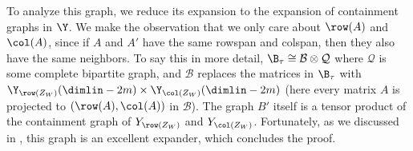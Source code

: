 To analyze this graph, we reduce its expansion to the expansion of containment graphs in \(\Y\). We make the observation that we only care about \(\row(A)\) and \(\col(A)\), since if \(A\) and \(A'\) have the same rowspan and colspan, then they also have the same neighbors. To say this in more detail, \(\B_\tau \cong \mathcal{B} \otimes \mathcal{Q}\) where \(\mathcal{Q}\) is some complete bipartite graph, and \(\mathcal{B}\) replaces the matrices in \(\B_\tau\) with \(\Y_{\row(Z_W)}(\dimlin-2m) \times \Y_{\col(Z_W)}(\dimlin-2m)\) (here every matrix \(A\) is projected to \((\row(A),\col(A))\) in \(\mathcal{B}\)).
%
The graph \(B'\) itself is a tensor product of the containment graph of \(Y_{\row(Z_W)}\) and \(Y_{\col(Z_W)}\). Fortunately, as we discussed in , this graph is an excellent expander, which concludes the proof.


